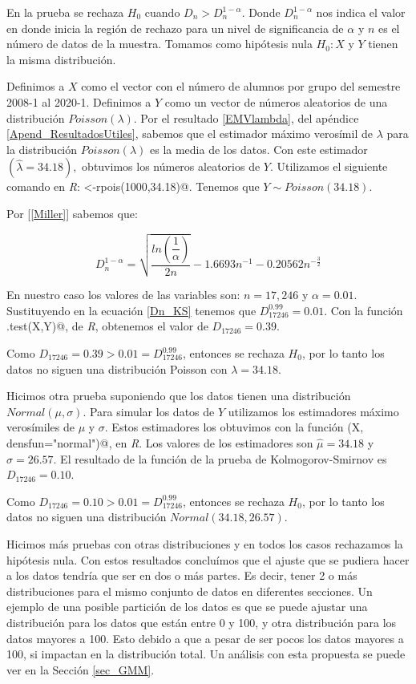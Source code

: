 En la prueba se rechaza $H_{0}$ cuando $D_{n} > D_{n}^{1-\alpha}$. Donde $D_{n}^{1-\alpha}$ nos indica el valor en donde inicia la región de rechazo para un nivel de significancia de $\alpha$ y $n$ es el número de datos de la muestra. Tomamos como hipótesis nula $H_{0}: X$ y $Y$ tienen la misma distribución.

Definimos a $X$ como el vector con el número de alumnos por grupo del semestre 2008-1 al 2020-1. Definimos a $Y$ como un vector de números aleatorios de una distribución $Poisson(\lambda)$. Por el resultado \ref{EMVlambda}, del apéndice \ref{Apend_ResultadosUtiles}, sabemos que el estimador máximo verosímil de $\lambda$ para la distribución $Poisson(\lambda)$ es la media de los datos. Con este estimador $(\hat{\lambda} = 34.18),$ obtuvimos los números aleatorios de $Y$. Utilizamos el siguiente comando en \textit{R}: \verb@Y<-rpois(1000,34.18)@. Tenemos que $Y \sim Poisson(34.18)$.%

Por [\ref{Miller}] sabemos que:
  
  \begin{equation}\label{Dn_KS}
D_{n}^{1-\alpha} = \sqrt{\dfrac{ln \left(\dfrac{1}{\alpha}\right)}{2n}} - 1.6693 n^{-1} - 0.20562 n^{-\frac{3}{2}}
\end{equation}

En nuestro caso los valores de las variables son: $n = 17,246$ y $\alpha = 0.01$. Sustituyendo en la ecuación \ref{Dn_KS} tenemos que $D_{17246}^{0.99} = 0.01$. Con la función \verb@ks.test(X,Y)@, de \textit{R}, obtenemos el valor de $D_{17246} = 0.39$.

Como $D_{17246} = 0.39 > 0.01 = D_{17246}^{0.99}$, entonces se rechaza $H_{0}$, por lo tanto los datos no siguen una distribución Poisson con $\lambda = 34.18$.


Hicimos otra prueba suponiendo que los datos tienen una distribución $Normal(\mu,\sigma)$. Para simular los datos de $Y$ utilizamos los estimadores máximo verosímiles de $\mu$ y $\sigma$. Estos estimadores los obtuvimos con la función \verb@fitdistr(X, densfun="normal")@, en \textit{R}. Los valores de los estimadores son $\hat{\mu} = 34.18$ y $\hat{\sigma} = 26.57$. El resultado de la función de la prueba de Kolmogorov-Smirnov es $D_{17246} = 0.10$.

Como $D_{17246} = 0.10 > 0.01 = D_{17246}^{0.99}$, entonces se rechaza $H_{0}$, por lo tanto los datos no siguen una distribución $Normal(34.18,26.57)$.

Hicimos más pruebas con otras distribuciones y en todos los casos rechazamos la hipótesis nula. Con estos resultados concluímos que el ajuste que se pudiera hacer a los datos tendría que ser en dos o más partes. Es decir, tener 2 o más distribuciones para el mismo conjunto de datos en diferentes secciones. Un ejemplo de una posible partición de los datos es que se puede ajustar una distribución para los datos que están entre 0 y 100, y otra distribución para los datos mayores a 100. Esto debido a que a pesar de ser pocos los datos mayores a 100, si impactan en la distribución total. Un análisis con esta propuesta se puede ver en la Sección \ref{sec_GMM}.

